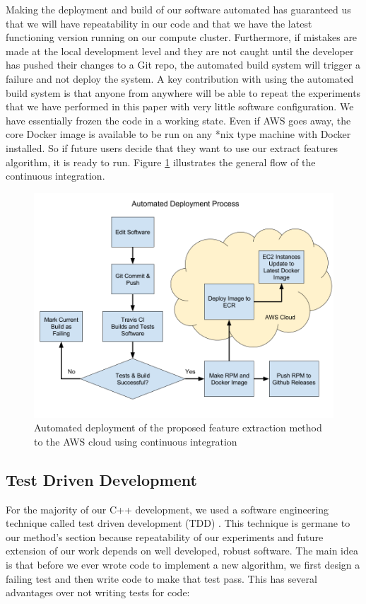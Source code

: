 Making the deployment and build of our software automated has guaranteed us
that we will have repeatability in our code and that we have the latest
functioning version running on our compute cluster. Furthermore, if mistakes are
made at the local development level and they are not caught until the developer
has pushed their changes to a Git repo, the automated build system will trigger
a failure and not deploy the system. A key contribution with using the automated
build system is that anyone from anywhere will be able to repeat the experiments
that we have performed in this paper with very little software configuration. We
have essentially frozen the code in a working state. Even if AWS goes away, the
core Docker image is available to be run on any *nix type machine with Docker installed.
So if future users decide that they want to use our extract features algorithm,
it is ready to run. Figure \ref{fig:continuous_integration} illustrates the
general flow of the continuous integration.

\begin{figure}[h]

  \centering
  \includegraphics[width=\textwidth]{figures/continuous_integration}
  \caption{Automated deployment of the proposed feature extraction method to
  the AWS cloud using continuous integration}
  \label{fig:continuous_integration}
\end{figure}

\subsection{\label{subsection:tdd}Test Driven Development}
For the majority of our C++ development, we used a software engineering technique
called test driven development (TDD) \cite{beck2003test}. This technique is germane to
our method's section because repeatability of our experiments and future
extension of our work depends on well developed, robust software. The main idea is that
before we ever wrote code to implement a new algorithm, we first design a failing
test and then write code to make that test pass. This has several advantages over
not writing tests for code:

